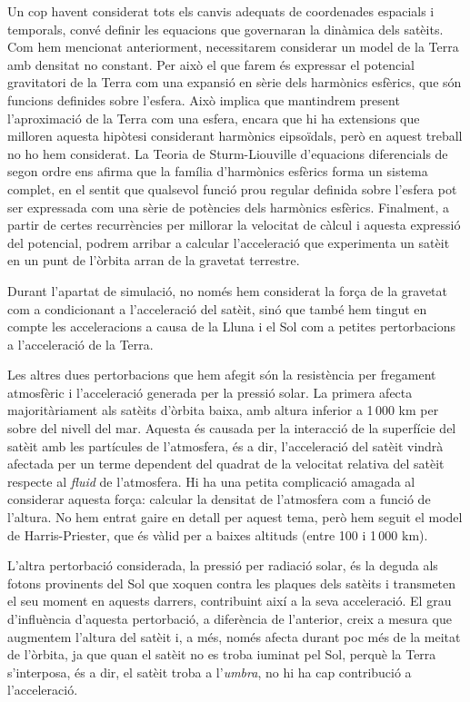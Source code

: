 \documentclass{article}
\begin{document}
Un cop havent considerat tots els canvis adequats de coordenades espacials i temporals, convé definir les equacions que governaran la dinàmica dels satè\lgem its. Com hem mencionat anteriorment, necessitarem considerar un model de la Terra amb densitat no constant. Per això el que farem és expressar el potencial gravitatori de la Terra com una expansió en sèrie dels harmònics esfèrics, que són funcions definides sobre l'esfera. Això implica que mantindrem present l'aproximació de la Terra com una esfera, encara que hi ha extensions que milloren aquesta hipòtesi considerant harmònics e\lgem ipsoïdals, però en aquest treball no ho hem considerat. La Teoria de Sturm-Liouville d'equacions diferencials de segon ordre ens afirma que la família d'harmònics esfèrics forma un sistema complet, en el sentit que qualsevol funció prou regular definida sobre l'esfera pot ser expressada com una sèrie de potències dels harmònics esfèrics. Finalment, a partir de certes recurrències per millorar la velocitat de càlcul i aquesta expressió del potencial, podrem arribar a calcular l'acceleració que experimenta un satè\lgem it en un punt de l'òrbita arran de la gravetat terrestre.

Durant l'apartat de simulació, no només hem considerat la força de la gravetat com a condicionant a l'acceleració del satè\lgem it, sinó que també hem tingut en compte les acceleracions a causa de la Lluna i el Sol com a petites pertorbacions a l'acceleració de la Terra.

Les altres dues pertorbacions que hem afegit són la resistència per fregament atmosfèric i l'acceleració generada per la pressió solar. La primera afecta majoritàriament als satè\lgem its d'òrbita baixa, amb altura inferior a 1\,000 km per sobre del nivell del mar. Aquesta és causada per la interacció de la superfície del satè\lgem it amb les partícules de l'atmosfera, és a dir, l'acceleració del satè\lgem it vindrà afectada per un terme dependent del quadrat de la velocitat relativa del satè\lgem it respecte al \emph{fluid} de l'atmosfera. Hi ha una petita complicació amagada al considerar aquesta força: calcular la densitat de l'atmosfera com a funció de l'altura. No hem entrat gaire en detall per aquest tema, però hem seguit el model de Harris-Priester, que és vàlid per a baixes altituds (entre 100 i 1\,000 km).

L'altra pertorbació considerada, la pressió per radiació solar, és la deguda als fotons provinents del Sol que xoquen contra les plaques dels satè\lgem its i transmeten el seu moment en aquests darrers, contribuint així a la seva acceleració. El grau d'influència d'aquesta pertorbació, a diferència de l'anterior, creix a mesura que augmentem l'altura del satè\lgem it i, a més, només afecta durant poc més de la meitat de l'òrbita, ja que quan el satè\lgem it no es troba i\lgem uminat pel Sol, perquè la Terra s'interposa, és a dir, el satè\lgem it troba a l'\emph{umbra}, no hi ha cap contribució a l'acceleració.
\end{document}
